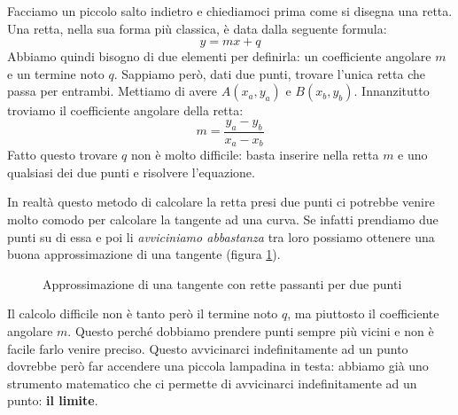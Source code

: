 Facciamo un piccolo salto indietro e chiediamoci prima come si disegna una retta. Una retta, nella sua forma più classica, è data dalla seguente formula:
\begin{equation*}
	y = mx + q
\end{equation*}
Abbiamo quindi bisogno di due elementi per definirla: un coefficiente angolare $m$ e un termine noto $q$. Sappiamo però, dati due punti, trovare l'unica retta che passa per entrambi. Mettiamo di avere $A(x_a, y_a)$ e $B(x_b, y_b)$. Innanzitutto troviamo il coefficiente angolare della retta:
\begin{equation*}
	m = \dfrac{y_a - y_b}{x_a - x_b}
\end{equation*}
Fatto questo trovare $q$ non è molto difficile: basta inserire nella retta $m$ e uno qualsiasi dei due punti e risolvere l'equazione.

In realtà questo metodo di calcolare la retta presi due punti ci potrebbe venire molto comodo per calcolare la tangente ad una curva. Se infatti prendiamo due punti su di essa e poi li \textit{avviciniamo abbastanza} tra loro possiamo ottenere una buona approssimazione di una tangente (figura \ref{fig_approxTangenteCurva}).



\begin{figure}[h]
\centering
{}
  \caption{Approssimazione di una tangente con rette passanti per due punti} 
	\label{fig_approxTangenteCurva}
\end{figure}

Il calcolo difficile non è tanto però il termine noto $q$, ma piuttosto il coefficiente angolare $m$. Questo perché dobbiamo prendere punti sempre più vicini e non è facile farlo venire preciso. Questo avvicinarci indefinitamente ad un punto dovrebbe però far accendere una piccola lampadina in testa: abbiamo già uno strumento matematico che ci permette di avvicinarci indefinitamente ad un punto: \textbf{il limite}. 

